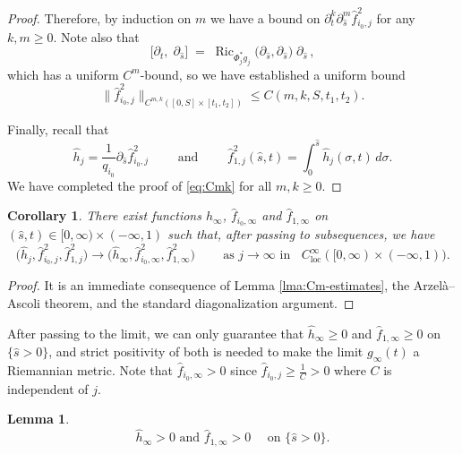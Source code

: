 \documentclass[11pt]{amsart}
\theoremstyle{plain}
\numberwithin{equation}{section}
\newtheorem{lemma}[theorem]{Lemma}
\newtheorem{corollary}[theorem]{Corollary}
\theoremstyle{definition}
\theoremstyle{remark}
\begin{document}
\begin{proof}
Therefore, by induction on $m$ we have a bound on $\partial_t^k \partial_{\hat{s}}^m \hat{f}_{i_0,j}^2$ for any $k, m \geq 0$. Note also that
\[\big[\partial_t,\; \partial_{\hat s}\big] \;=\; \operatorname{Ric}_{\Phi_j^*g_j}\!\big(\partial_{\hat s}, \partial_{\hat s}\big)\;\partial_{\hat s}\,,\]
which has a uniform $C^m$-bound, so we have established a uniform bound 
\[\big\|\hat{f}_{i_0,j}^2\big\|_{C^{m,k}([0,S]\times[t_1,t_2])} \leq C(m,k,S,t_1,t_2).\]

Finally, recall that
\[\hat{h}_j = \frac{1}{q_{i_0}}\partial_{\hat{s}}\hat{f}_{i_0,j}^2 \qquad \text{ and } \qquad \hat{f}_{1,j}^2(\hat{s},t) = \int_0^{\hat{s}}\hat{h}_j(\sigma,t)\,d\sigma.\]
We have completed the proof of \eqref{eq:Cmk} for all $m, k \geq 0$.
\end{proof}

\begin{corollary}
\label{cor:h_and_f}
There exist functions $\hat{h}_\infty$, $\hat{f}_{i_0, \infty}$ and $\hat{f}_{1,\infty}$ on $(\hat{s},t) \in [0,\infty) \times (-\infty, 1)$ such that, after passing to subsequences,  we have
\[\big(\hat{h}_j, \hat{f}_{i_0,j}^2, \hat{f}_{1,j}^2\big) \to \big(\hat{h}_\infty, \hat{f}_{i_0,\infty}^2, \hat{f}_{1,\infty}^2\big)\ \qquad \text{as $j \to \infty$ in }\;\; C^\infty_{\mathrm{loc}}([0,\infty)\times(-\infty,1)).\]
\end{corollary}

\begin{proof}
It is an immediate consequence of Lemma \ref{lma:Cm-estimates}, the Arzel\`a--Ascoli theorem, and the standard diagonalization argument.
\end{proof}

After passing to the limit, we can only guarantee that $\hat{h}_\infty \geq 0$ and $\hat{f}_{1, \infty} \geq 0$ on $\{ \hat{s} > 0 \}$, and strict positivity of both is needed to make the limit $g_\infty (t)$ a Riemannian metric. Note that $\hat{f}_{i_0, \infty} > 0$ since $\hat{f}_{i_0,j} \geq \frac{1}{C} > 0$ where $C$ is independent of $j$.

\begin{lemma}
\label{lma:h-f-positive}
\[\hat{h}_\infty > 0 \text{ and } \hat{f}_{1,\infty} > 0 \quad \text{ on $\{\hat{s} > 0\}$}.\]	
\end{lemma}
\end{document}
